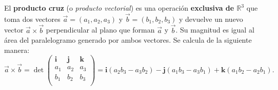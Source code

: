 \begin{definition} \label{defprodcruz}
El \textbf{producto cruz} (o \textit{producto vectorial}) es una operación \textbf{exclusiva de $\mathbb{R}^3$} que toma dos vectores $\vec{a} = (a_1, a_2, a_3)$ y $\vec{b} = (b_1, b_2, b_3)$ y devuelve un nuevo vector $\vec{a} \times \vec{b}$ perpendicular al plano que forman $\vec{a}$ y $\vec{b}$. Su magnitud es igual al área del paralelogramo generado por ambos vectores. Se calcula de la siguiente manera: 
\[
\vec{a} \times \vec{b} = \det\begin{pmatrix}
\mathbf{i} & \mathbf{j} & \mathbf{k} \\
a_1 & a_2 & a_3 \\
b_1 & b_2 & b_3 \\
\end{pmatrix} = \mathbf{i}(a_2b_3 - a_3b_2) - \mathbf{j}(a_1b_3 - a_3b_1) + \mathbf{k}(a_1b_2 - a_2b_1).
\]
\end{definition}


